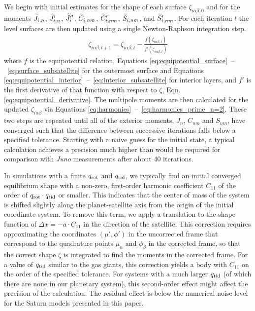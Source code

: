 We begin with initial estimates for the shape of each surface
$\zeta_{i\alpha\beta,0}$ and for the moments $\widetilde{J}_{i,n}$, $\widetilde{J}'_{i,n}$,
$\widetilde{J}''_i$, $\widetilde{C}_{i,nm}$, $\widetilde{C}'_{i,nm}$, $\widetilde{S}_{i,nm}$, and
$\widetilde{S}'_{i,nm}$. For each iteration $t$ the level surfaces are then updated using a
single Newton-Raphson integration step. 
%
\begin{equation} \begin{aligned} \zeta_{i\alpha\beta,t+1} = \zeta_{i\alpha\beta,t} -
        \frac{ f( \zeta_{i\alpha\beta,t})}{ f'( \zeta_{i\alpha\beta,t}) }
    \end{aligned} \label{eq:newton} \end{equation}
%
where $f$ is the equipotential relation, Equations
\eqref{eq:equipotential_surface}~--~\eqref{eq:surface_subsatellite} for the outermost
surface and Equations
\eqref{eq:equipotential_interior}~--~\eqref{eq:interior_subsatellite} for interior
layers, and $f'$ is the first derivative of that function with respect to $\zeta$, Eqn.
\eqref{eq:equipotential_derivative}. The multipole moments are then calculated for
the updated $\zeta_{i\alpha\beta}$ via Equations
\eqref{eq:harmonics}~--~\eqref{eq:harmonics_prime_n=2}. These two steps are repeated
until all of the exterior moments, $J_{n}$, $C_{nm}$ and $S_{nm}$,
have converged such that the difference between successive iterations falls below a
specified tolerance. Starting with a naive guess for the initial state, a typical
calculation achieves a precision much higher than would be required for comparison
with \textit{Juno} measurements after about 40 iterations.

In simulations with a finite $q_{\rm rot}$ and $q_{\rm tid}$, we typically find an
initial converged equilibrium shape with a non-zero, first-order harmonic coefficient
$C_{11}$ of the order of $q_{\rm rot} \cdot q_{\rm tid}$ or smaller. This indicates
that the center of mass of the system is shifted slightly along the planet-satellite
axis from the origin of the initial coordinate system. To remove this term, we apply
a translation to the shape function of $\Delta x=-a\cdot C_{11}$ in the direction of
the satellite. This correction requires approximating the coordinates $(\mu',\phi')$
in the uncorrected frame that correspond to the quadrature points $\mu_\alpha$ and
$\phi_\beta$ in the corrected frame, so that the correct shape $\zeta$ is integrated
to find the moments in the corrected frame. For a value of $q_{\rm tid}$ similar to
the gas giants, this correction yields a body with $C_{11}$ on the order of the
specified tolerance. For systems with a much larger $q_{\rm tid}$ (of which there are
none in our planetary system), this second-order effect might affect the precision of
the calculation.  The residual effect is below the numerical noise level for the
Saturn models presented in this paper.

